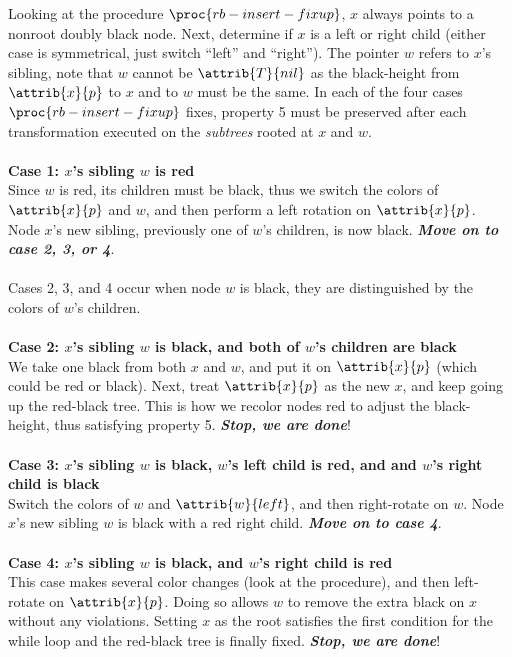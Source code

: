 \documentclass[12pt]{article}
\begin{document}
\newpage
Looking at the procedure $\proc{rb-insert-fixup}$, $x$ always points to a nonroot doubly black node. Next, determine if $x$ is a left or right child (either case is symmetrical, just switch ``left'' and ``right''). The pointer $w$ refers to $x$'s sibling, note that $w$ cannot be $\attrib{T}{nil}$ as the black-height from $\attrib{x}{p}$ to $x$ and to $w$ must be the same. In each of the four cases $\proc{rb-insert-fixup}$ fixes, property 5 must be preserved after each transformation executed on the \textit{subtrees} rooted at $x$ and $w$.
\\ \\
\textbf{Case 1: $x$'s sibling $w$ is red}\\
Since $w$ is red, its children must be black, thus we switch the colors of $\attrib{x}{p}$ and $w$, and then perform a left rotation on $\attrib{x}{p}$. Node $x$'s new sibling, previously one of $w$'s children, is now black. \textbf{\emph{Move on to case 2, 3, or 4}}.
\\ \\
Cases 2, 3, and 4 occur when node $w$ is black, they are distinguished by the colors of $w$'s children.
\\ \\
\textbf{Case 2: $x$'s sibling $w$ is black, and both of $w$'s children are black}\\
We take one black from both $x$ and $w$, and put it on $\attrib{x}{p}$ (which could be red or black). Next, treat $\attrib{x}{p}$ as the new $x$, and keep going up the red-black tree. This is how we recolor nodes red to adjust the black-height, thus satisfying property 5. \textbf{\emph{Stop, we are done}}!
\\ \\
\textbf{Case 3: $x$'s sibling $w$ is black, $w$'s left child is red, and and $w$'s right child is black}\\
Switch the colors of $w$ and $\attrib{w}{left}$, and then right-rotate on $w$. Node $x$'s new sibling $w$ is black with a red right child.
\textbf{\emph{Move on to case 4}}.
\\ \\
\textbf{Case 4: $x$'s sibling $w$ is black, and $w$'s right child is red}\\
This case makes several color changes (look at the procedure), and then left-rotate on $\attrib{x}{p}$. Doing so allows $w$ to remove the extra black on $x$ without any violations. Setting $x$ as the root satisfies the first condition for the while loop and the red-black tree is finally fixed. \textbf{\emph{Stop, we are done}}!
\end{document}
